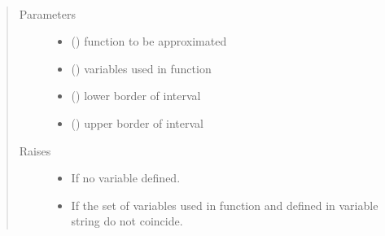\documentclass[letterpaper,10pt,english]{sphinxmanual}
\begin{document}

\begin{fulllineitems}
\label{\detokenize{index:Studienprojekt_Smolyak_qmc_one_point.rewrite_function}}~\begin{quote}\begin{description}
\item[{Parameters}] \leavevmode\begin{itemize}
\item {} 
 () \textendash{} function to be approximated

\item {} 
 () \textendash{} variables used in function

\item {} 
 () \textendash{} lower border of interval

\item {} 
 () \textendash{} upper border of interval

\end{itemize}

\item[{Raises}] \leavevmode\begin{itemize}
\item {} 
 \textendash{} If no variable defined.

\item {} 
 \textendash{} If the set of variables used in function and defined in variable  string do not coincide.


\end{itemize}
\end{description}
\end{quote}
\end{fulllineitems}
\end{document}
